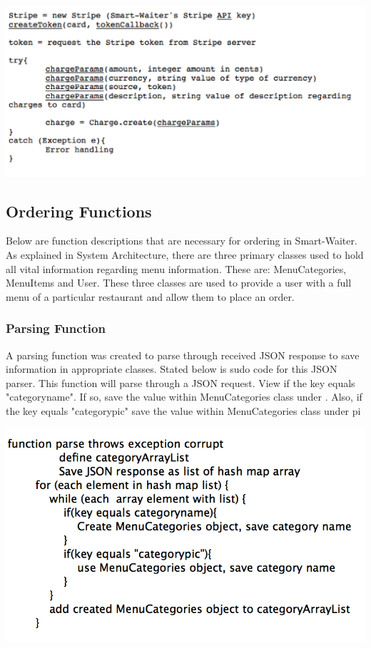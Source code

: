 \documentclass[12pt, titlepage]{article}
\begin{document}
\includegraphics[width=150mm,scale=0.5]{stripe.png}

\subsection{Ordering Functions}
Below are function descriptions that are necessary for ordering in Smart-Waiter. As explained in System Architecture, there are three primary classes used to hold all vital information regarding menu information. These are: MenuCategories, MenuItems and User. These three classes are used to provide a user with a full menu of a particular restaurant and allow them to place an order.

\subsubsection{Parsing Function}
A parsing function was created to parse through received JSON response to save information in appropriate classes. Stated below is sudo code for this JSON parser. This function will parse through a JSON request. View if the key equals "categoryname". If so, save the value within MenuCategories class under . Also, if the key equals "categorypic" save the value within MenuCategories  class under pi

\includegraphics[width=150mm,scale=0.5]{parser.png}
\end{document}
